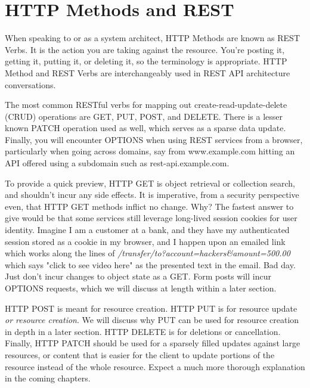 \section{HTTP Methods and REST}

When speaking to or as a system architect, HTTP Methods are known as REST Verbs.  It is the action you are taking against the resource.  You're posting it, getting it, putting it, or deleting it, so the terminology is appropriate.  HTTP Method and REST Verbs are interchangeably used in REST API architecture conversations.

The most common RESTful verbs for mapping out create-read-update-delete (CRUD) operations are GET, PUT, POST, and DELETE.  There is a lesser known PATCH operation used as well, which serves as a sparse data update.  Finally, you will encounter OPTIONS when using REST services from a browser, particularly when going across domains, say from www.example.com hitting an API offered using a subdomain such as rest-api.example.com.

To provide a quick preview, HTTP GET is object retrieval or collection search, and shouldn't incur any side effects.  It is imperative, from a security perspective even, that HTTP GET methods inflict no change.  Why?  The fastest answer to give would be that some services still leverage long-lived session cookies for user identity.  Imagine I am a customer at a bank, and they have my authenticated session stored as a cookie in my browser, and I happen upon an emailed link which works along the lines of \textit{/transfer/to?account=hackers\&amount=500.00} which says "click to see video here" as the presented text in the email.  Bad day.  Just don't incur changes to object state as a GET.  Form posts will incur OPTIONS requests, which we will discuss at length within a later section.

HTTP POST is meant for resource creation.  HTTP PUT is for resource update \textit{or resource creation}.  We will discuss why PUT can be used for resource creation in depth in a later section. HTTP DELETE is for deletions or cancellation.  Finally, HTTP PATCH should be used for a sparsely filled updates against large resources, or content that is easier for the client to update portions of the resource instead of the whole resource.  Expect a much more thorough explanation in the coming chapters.

